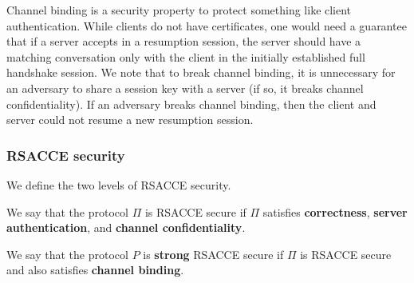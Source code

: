 \begin{remark}
Channel binding is a security property to protect something like client authentication.
While clients do not have certificates, one would need a guarantee that if a server accepts
in a resumption session, the server should have a matching conversation only with the client
in the initially established full handshake session.
We note that to break channel binding, it is unnecessary for an adversary to share a session key with a server
(if so, it breaks channel confidentiality).
If an adversary breaks channel binding, then the client and server could not resume a new resumption session.
\end{remark}

\subsubsection{RSACCE security}
We define the two levels of RSACCE security.

\begin{definition}
 We say that the protocol $\Pi$ is RSACCE secure if $\Pi$ satisfies \textbf{correctness},
 \textbf{server authentication}, and \textbf{channel confidentiality}.
\end{definition}

\begin{definition}
 We say that the protocol $P$ is \textbf{strong} RSACCE secure if $\Pi$ is RSACCE secure
 and also satisfies \textbf{channel binding}.
\end{definition}